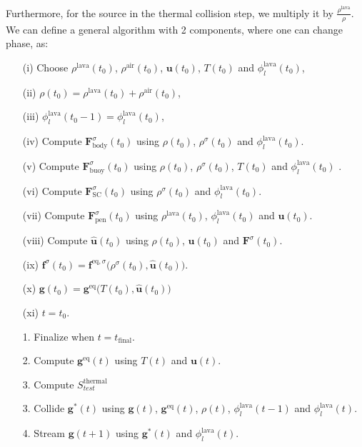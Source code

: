 Furthermore, for the source in the thermal collision step, we multiply it by $\frac{\rho^{\text{lava}}}{\rho}$. We can define a general algorithm with 2 components, where one can change phase, as:

\clearpage

\begin{itemize}\label{it:Algorithm phase change in two-component fluid}
    \item[(i)] Choose $\rho^{\text{lava}}(t_0)$, $\rho^{\text{air}}(t_0)$, $\bm{u}(t_0)$, $T(t_0)$ and $\phi_l^{\text{lava}}(t_0)$,
    \item[(ii)] $\rho(t_0) = \rho^{\text{lava}}(t_0) + \rho^{\text{air}}(t_0)$,
    \item[(iii)] $\phi_l^{\text{lava}}(t_0-1) = \phi_l^{\text{lava}}(t_0)$,
    \item[(iv)] Compute $\bm{F}^\sigma_{\text{body}}(t_0)$ using $\rho(t_0)$, $\rho^\sigma(t_0)$ and $\phi_l^{\text{lava}}(t_0)$.
    \item[(v)] Compute $\bm{F}^\sigma_{\text{buoy}}(t_0)$ using $\rho(t_0)$, $\rho^\sigma(t_0)$, $T(t_0)$ and $\phi_l^{\text{lava}}(t_0)$ .
    \item[(vi)] Compute $\bm{F}^\sigma_{\text{SC}}(t_0)$ using $\rho^\sigma(t_0)$ and $\phi_l^{\text{lava}}(t_0)$.
    \item[(vii)] Compute $\bm{F}^\sigma_{\text{pen}}(t_0)$ using $\rho^{\text{lava}}(t_0)$, $\phi_l^{\text{lava}}(t_0)$ and $\bm{u}(t_0)$.
    \item[(viii)] Compute $\hat{\bm{u}}(t_0)$ using $\rho(t_0)$, $\bm{u}(t_0)$ and $\bm{F}^\sigma(t_0)$.
    \item[(ix)] $\bm{f}^\sigma(t_0) = \bm{f}^{\text{eq},\sigma}\bigl(\rho^\sigma(t_0), \hat{\bm{u}}(t_0)\bigr)$.
    \item[(x)] $\bm{g}(t_0) = \bm{g}^{\text{eq}}\bigl(T(t_0), \hat{\bm{u}}(t_0)\bigr)$
    \item[(xi)] $t = t_0$.
    \item[1.] Finalize when $t = t_{\text{final}}$.
    \item[2.] Compute $\bm{g}^{\text{eq}}(t)$ using $T(t)$ and $\bm{u}(t)$.
    \item[3.] Compute $S^{\text{thermal}}_{test}$ 
    \item[3.] Collide $\bm{g}^*(t)$ using $\bm{g}(t)$, $\bm{g}^{\text{eq}}(t)$, $\rho(t)$, $\phi_l^{\text{lava}}(t-1)$ and $\phi_l^{\text{lava}}(t)$.
    \item[4.] Stream $\bm{g}(t+1)$ using $\bm{g}^*(t)$ and $\phi_l^{\text{lava}}(t)$.

\end{itemize}

